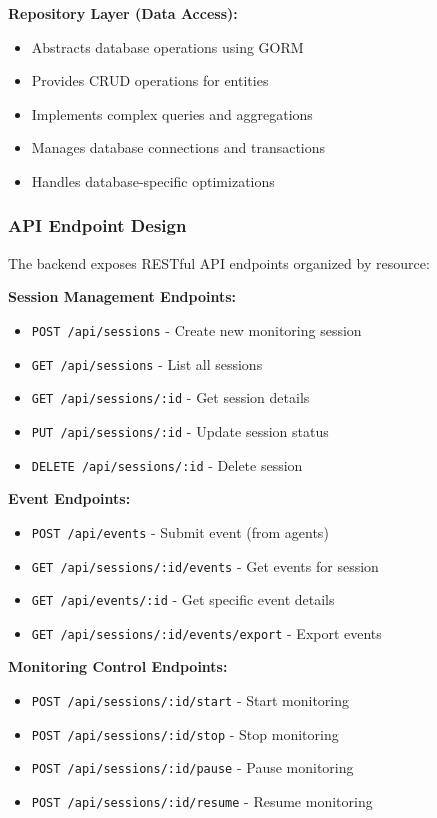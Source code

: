 \textbf{Repository Layer (Data Access):}
\begin{itemize}
    \item Abstracts database operations using GORM
    \item Provides CRUD operations for entities
    \item Implements complex queries and aggregations
    \item Manages database connections and transactions
    \item Handles database-specific optimizations
\end{itemize}

\subsubsection{API Endpoint Design}

The backend exposes RESTful API endpoints organized by resource:

\textbf{Session Management Endpoints:}
\begin{itemize}
    \item \texttt{POST /api/sessions} - Create new monitoring session
    \item \texttt{GET /api/sessions} - List all sessions
    \item \texttt{GET /api/sessions/:id} - Get session details
    \item \texttt{PUT /api/sessions/:id} - Update session status
    \item \texttt{DELETE /api/sessions/:id} - Delete session
\end{itemize}

\textbf{Event Endpoints:}
\begin{itemize}
    \item \texttt{POST /api/events} - Submit event (from agents)
    \item \texttt{GET /api/sessions/:id/events} - Get events for session
    \item \texttt{GET /api/events/:id} - Get specific event details
    \item \texttt{GET /api/sessions/:id/events/export} - Export events
\end{itemize}

\textbf{Monitoring Control Endpoints:}
\begin{itemize}
    \item \texttt{POST /api/sessions/:id/start} - Start monitoring
    \item \texttt{POST /api/sessions/:id/stop} - Stop monitoring
    \item \texttt{POST /api/sessions/:id/pause} - Pause monitoring
    \item \texttt{POST /api/sessions/:id/resume} - Resume monitoring
\end{itemize}

